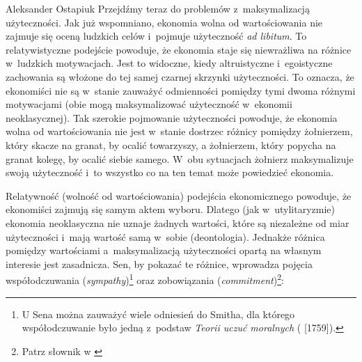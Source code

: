 \begin{artplenv}{Aleksander Ostapiuk}
Przejdźmy teraz do problemów z~maksymalizacją użyteczności. Jak już wspomniano, ekonomia wolna od wartościowania nie
zajmuje się oceną ludzkich celów i~pojmuje użyteczność \textit{ad libitum}. To relatywistyczne podejście powoduje, że
ekonomia staje się niewrażliwa na różnice w~ludzkich motywacjach. Jest to widoczne, kiedy altruistyczne i~egoistyczne
zachowania są włożone do tej samej czarnej skrzynki użyteczności. To oznacza, że ekonomiści nie są w~stanie
zauważyć odmienności pomiędzy tymi dwoma różnymi motywacjami (obie mogą maksymalizować użyteczność w~ekonomii
neoklasycznej). Tak szerokie pojmowanie użyteczności powoduje, że ekonomia wolna od wartościowania nie jest w~stanie
dostrzec różnicy pomiędzy żołnierzem, który skacze na granat, by ocalić towarzyszy, a żołnierzem, który popycha na
granat kolegę, by ocalić siebie samego. W~obu sytuacjach żołnierz maksymalizuje swoją użyteczność i~to
wszystko co na ten temat może powiedzieć ekonomia. 

Relatywność (wolność od wartościowania) podejścia ekonomicznego powoduje, że ekonomiści zajmują się samym aktem wyboru.
Dlatego (jak w~utylitaryzmie) ekonomia neoklasyczna nie uznaje żadnych wartości, które są niezależne od miar
użyteczności i~mają wartość samą w~sobie (deontologia). Jednakże różnica pomiędzy wartościami a~maksymalizacją
użyteczności opartą na własnym interesie jest zasadnicza. Sen, by pokazać te różnice, wprowadza pojęcia
współodczuwania (\textit{sympathy})\footnote{U Sena można zauważyć wiele odniesień do Smitha, dla którego współodczuwanie było
	jedną z~podstaw \textit{Teorii uczuć moralnych}
	(\cite{smith_teoria_1989_ost} [1759]).
} oraz zobowiązania (\textit{commitment})\footnote{Patrz słownik w \parencite{hausman_etyka_2017_ost}}:




\end{artplenv}
